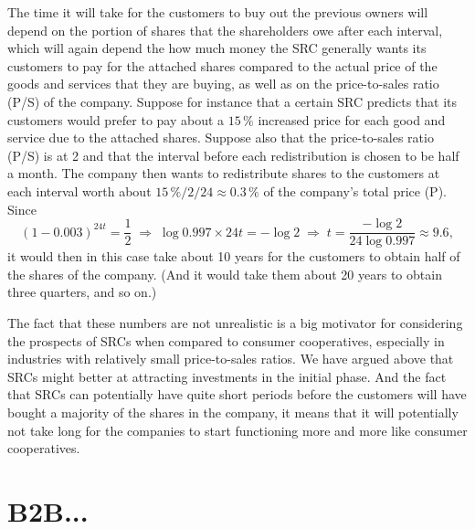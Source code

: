 \documentclass{article}
\begin{document}
The time it will take for the customers to buy out the previous owners will depend on the portion of shares that the shareholders owe after each interval, which will again depend the how much money the SRC generally wants its customers to pay for the attached shares compared to the actual price of the goods and services that they are buying, as well as on the price-to-sales ratio (P/S) of the company. Suppose for instance that a certain SRC predicts that its customers would prefer to pay about a $15\, \%$ increased price for each good and service due to the attached shares. Suppose also that the price-to-sales ratio (P/S) is at 2 and that the interval before each redistribution is chosen to be half a month. The company then wants to redistribute shares to the customers at each interval worth about $15\, \% / 2 / 24 \approx 0.3\, \%$ of the company's total price (P).
Since
\[
	(1 - 0.003)^{24 t} = \frac{1}{2} 
	\;\Rightarrow\; 
	\log 0.997 \times 24 t = -\log 2 
	\;\Rightarrow\; 
	t = \frac{-\log 2}{24 \log 0.997} \approx 9.6,
\]
it would then in this case take about 10 years for the customers to obtain half of the shares of the company. (And it would take them about 20 years to obtain three quarters, and so on.)

The fact that these numbers are not unrealistic is a big motivator for considering the prospects of SRCs when compared to consumer cooperatives, especially in industries with relatively small price-to-sales ratios. We have argued above that SRCs might better at attracting investments in the initial phase. And the fact that SRCs can potentially have quite short periods before the customers will have bought a majority of the shares in the company, it means that it will potentially not take long for the companies to start functioning more and more like consumer cooperatives.




\section{B2B...}
\label{sect_B2B}



\end{document}
